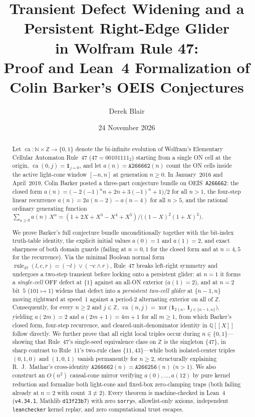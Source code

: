\documentclass[11pt]{article}
\title{Transient Defect Widening and a Persistent Right-Edge Glider\\in Wolfram Rule 47:\\[2pt]
\large Proof and Lean~4 Formalization of Colin Barker's OEIS \seq{A266662} Conjectures}
\author{Derek Blair}
\date{24 November 2026}
\newcommand{\llbracket}{[\![}
\newcommand{\rrbracket}{]\!]}
\theoremstyle{definition}
\newcommand{\N}{\mathbb{N}}
\newcommand{\Z}{\mathbb{Z}}
\newcommand{\Q}{\mathbb{Q}}
\newcommand{\seq}[1]{\texttt{#1}}
\newcommand{\ruleFS}{\operatorname{rule}_{47}}
\newcommand{\ca}{\operatorname{ca}}
\begin{document}
\maketitle

\begin{abstract}
Let $\ca : \N \times \Z \to \{0, 1\}$ denote the bi-infinite evolution of Wolfram's Elementary Cellular Automaton Rule~47 ($47 = 00101111_2$) starting from a single ON cell at the origin, $\ca(0, j) = \mathbf{1}_{j=0}$, and let $a(n) = \seq{A266662}(n)$ count the ON cells inside the active light-cone window $[-n, n]$ at generation $n \ge 0$. In January~2016 and April~2019, Colin Barker posted a three-part conjecture bundle on OEIS~\seq{A266662}: the closed form $a(n) = \bigl(-2(-1)^n n + 2n + 3(-1)^n + 1\bigr)/2$ for all $n > 1$, the four-step linear recurrence $a(n) = 2a(n-2) - a(n-4)$ for all $n > 5$, and the rational ordinary generating function $\sum_{n \ge 0} a(n)\,X^n = (1 + 2X + X^3 - X^4 + X^5)/\bigl((1 - X)^2(1 + X)^2\bigr)$.

We prove Barker's full conjecture bundle unconditionally together with the bit-index truth-table identity, the explicit initial values $a(0) = 1$ and $a(1) = 2$, and exact sharpness of both domain guards (failing at $n = 0, 1$ for the closed form and at $n = 4, 5$ for the recurrence). Via the minimal Boolean normal form $\ruleFS(l, c, r) = (\neg l) \lor (\neg c \land r)$, Rule~47 breaks left-right symmetry and undergoes a two-step transient before locking onto a persistent glider: at $n = 1$ it forms a \emph{single-cell} OFF defect at $\{1\}$ against an all-ON exterior ($a(1) = 2$), and at $n = 2$ bit~$5$ ($101 \mapsto 1$) widens that defect into a \emph{persistent two-cell glider} at $\{n - 1, n\}$ moving rightward at speed~$1$ against a period-$2$ alternating exterior on all of $\Z$. Consequently, for every $n \ge 2$ and $j \in \Z$, $\ca(n, j) = \operatorname{xor}\bigl(\mathbf{1}_{2 \nmid n},\, \mathbf{1}_{j \in \{n-1, n\}}\bigr)$, yielding $a(2m) = 2$ and $a(2m + 1) = 4m + 1$ for all $m \ge 1$, from which Barker's closed form, four-step recurrence, and cleared-unit-denominator identity in $\Q\llbracket X \rrbracket$ follow directly. We further prove that all eight local triples occur during $n \in \{0, 1\}$---showing that Rule~47's single-seed equivalence class on $\Z$ is the singleton $\{47\}$, in sharp contrast to Rule~11's two-rule class $\{11, 43\}$---while both isolated-center triples $(0, 1, 0)$ and $(1, 0, 1)$ vanish permanently for $n \ge 2$, structurally explaining R.~J.\ Mathar's cross-identity $\seq{A266662}(n) = \seq{A266256}(n)$ ($n > 1$). We also construct an $O(n^2)$ causal-cone mirror verifying $a(0), \dots, a(12)$ by pure kernel reduction and formalize both light-cone and fixed-box zero-clamping traps (both failing already at $n = 2$ with count~$3 \ne 2$). Every theorem is machine-checked in Lean~4 (\texttt{v4.34.1}, Mathlib \texttt{d13f23b7}) with zero \texttt{sorry}s, allowlist-only axioms, independent \texttt{leanchecker} kernel replay, and zero computational trust escapes.
\end{abstract}
\end{document}
